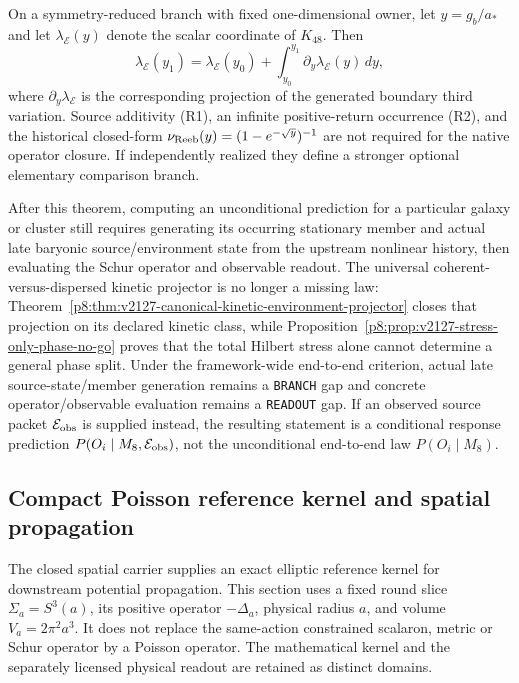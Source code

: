 \documentclass[12pt,a4paper]{article}
\begin{document}
\begin{corollary}
\label{p8:cor:v2123-scalar-reduction-firewall}
On a symmetry-reduced branch with fixed one-dimensional owner, let
$y=g_b/a_*$ and let $\lambda_{\mathcal E}(y)$ denote the scalar coordinate of
$K_{48}$.  Then
\[
 \boxed{
 \lambda_{\mathcal E}(y_1)
 =\lambda_{\mathcal E}(y_0)
 +\int_{y_0}^{y_1}
 \partial_y\lambda_{\mathcal E}(y)\,dy,}
\]
where $\partial_y\lambda_{\mathcal E}$ is the corresponding projection of the
generated boundary third variation.  Source additivity (R1), an infinite
positive-return occurrence (R2), and the historical closed-form
$\nu_{\rm Reeb}(y)=(1-e^{-\sqrt y})^{-1}$ are not required for the native
operator closure.  If independently realized they define a stronger optional
elementary comparison branch.

After this theorem, computing an unconditional prediction for a particular
galaxy or cluster still requires generating its occurring stationary member
and actual late baryonic source/environment state from the upstream nonlinear
history, then evaluating the Schur operator and observable readout.  The
universal coherent-versus-dispersed kinetic projector is no longer a missing
law: Theorem~\ref{p8:thm:v2127-canonical-kinetic-environment-projector} closes
that projection on its declared kinetic class, while
Proposition~\ref{p8:prop:v2127-stress-only-phase-no-go} proves that the total
Hilbert stress alone cannot determine a general phase split.  Under the
framework-wide end-to-end criterion, actual late source-state/member
generation remains a \texttt{BRANCH} gap and concrete operator/observable
evaluation remains a \texttt{READOUT} gap.  If an observed source packet
$\mathcal E_{\rm obs}$ is supplied instead, the resulting statement is a
conditional response prediction $P(O_i\mid M_8,\mathcal E_{\rm obs})$, not the
unconditional end-to-end law $P(O_i\mid M_8)$.
\end{corollary}


\subsection{Compact Poisson reference kernel and spatial propagation}
\label{p8:sec:v2204-compact-poisson-reference}

The closed spatial carrier supplies an exact elliptic reference kernel for
downstream potential propagation. This section uses a fixed round slice
$\Sigma_a=S^3(a)$, its positive operator $-\Delta_a$, physical radius $a$,
and volume $V_a=2\pi^2a^3$. It does not replace the same-action constrained
scalaron, metric or Schur operator by a Poisson operator. The mathematical
kernel and the separately licensed physical readout are retained as distinct
domains.
\end{document}
